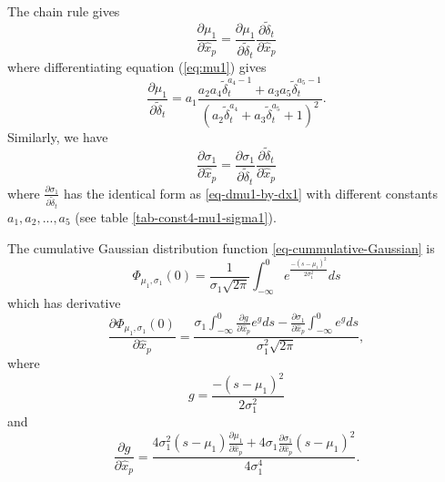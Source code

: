 \documentclass[extra, onecolumn, doublespacing]{gji}
\begin{document}
The chain rule gives
\begin{equation}
\frac{\partial \mu_1}{\partial \hat{x}_p} = \frac{\partial \mu_1}{\partial \widetilde{\delta}_t} \frac{\partial \widetilde{\delta}_t}{\partial \hat{x}_p}
\end{equation}
where differentiating equation (\ref{eq:mu1}) gives
\begin{equation}
\label{eq-dmu1-by-dx1}
\frac{\partial \mu_1}{\partial \widetilde{\delta}_t} = a_1 \frac{a_2 a_4 \widetilde{\delta}_t^{a_4-1} +a_3 a_5 \widetilde{\delta}_t^{a_5-1}}
{\left(a_2 \widetilde{\delta}_t^{a_4} +a_3 \widetilde{\delta}_t^{a_5} +1 \right)^2}.
\end{equation}
Similarly, we have
\begin{equation}
\frac{\partial \sigma_1}{\partial \hat{x}_p} = \frac{\partial \sigma_1}{\partial \widetilde{\delta}_t} \frac{\partial \widetilde{\delta}_t}
{\partial \hat{x}_p}
\end{equation}
where $\frac{\partial \sigma_1}{\partial \widetilde{\delta}_t}$ has the identical form as \ref{eq-dmu1-by-dx1} with different constants
$a_1,a_2,...,a_5$ (see table \ref{tab-const4-mu1-sigma1}).

The cumulative Gaussian distribution function \ref{eq-cummulative-Gaussian} is
\begin{equation}
\Phi_{\mu_1,\sigma_1}(0) = \frac{1}{\sigma_1 \sqrt{2 \pi}}
\int_{-\infty}^0 e^{  \frac{-(s-\mu_1)^2}{2\sigma_1^2}  } ds
\end{equation}
which has derivative
\begin{equation}
\frac{\partial \Phi_{\mu_1,\sigma_1}(0)}{\partial \hat{x}_p} =
\frac{ \sigma_1 \int_{-\infty}^0 \frac{\partial g}{\partial \hat{x}_p} e^g ds -
\frac{\partial \sigma_1}{\partial \hat{x}_p} \int_{-\infty}^0 e^g ds}
{\sigma_1^2 \sqrt{2 \pi}},
\end{equation}
where
\begin{equation}
g = \frac{-(s-\mu_1)^2}{2 \sigma_1^2}
\end{equation}
and
\begin{equation}
\frac{\partial g}{\partial \hat{x}_p} = \frac{4 \sigma_1^2 (s-\mu_1) \frac{\partial \mu_1}{\partial \hat{x}_p}
+ 4\sigma_1 \frac{\partial \sigma_1}{\partial \hat{x}_p}(s-\mu_1)^2}
{4 \sigma_1^4}.
\end{equation}
\end{document}

